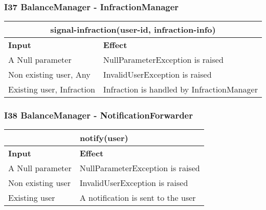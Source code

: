 \subsubsection{I37 BalanceManager - InfractionManager}
\begin{tabular}{|p{5cm}|p{7cm}|}
\hline
\multicolumn{2}{|c|}{signal-infraction(user-id, infraction-info)} \\
\hline
\textbf{Input} & \textbf{Effect} \\

\hline
A Null parameter & NullParameterException is raised \\

\hline
Non existing user, Any & InvalidUserException is raised \\

\hline
Existing user, Infraction & Infraction is handled by InfractionManager \\
\hline
\end{tabular}

\subsubsection{I38 BalanceManager - NotificationForwarder}
\begin{tabular}{|p{5cm}|p{7cm}|}
\hline
\multicolumn{2}{|c|}{notify(user)} \\
\hline
\textbf{Input} & \textbf{Effect} \\

\hline
A Null parameter & NullParameterException is raised \\

\hline
Non existing user & InvalidUserException is raised \\

\hline
Existing user & A notification is sent to the user \\
\hline
\end{tabular}

